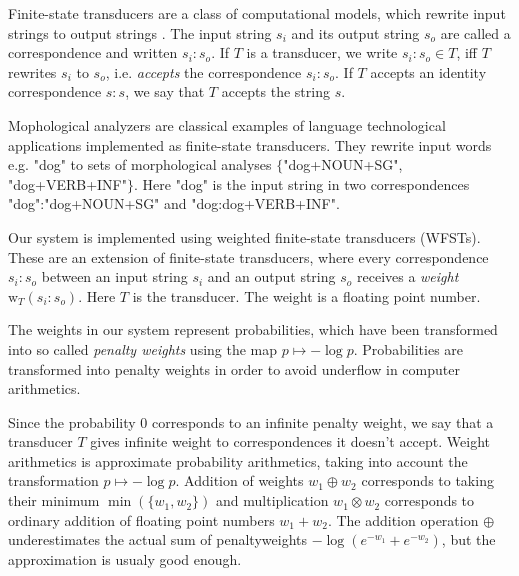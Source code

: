 \documentclass[a4paper,conference]{IEEEtran}
\begin{document}
Finite-state transducers are a class of computational models, which
rewrite input strings to output strings \cite{beesley/2003}. The input
string $s_i$ and its output string $s_o$ are called a correspondence
and written $s_i\mathrm{:}s_o$. If $T$ is a transducer, we write
$s_i\mathrm{:}s_o \in T$, iff $T$ rewrites $s_i$ to $s_o$, i.e. {\it
  accepts} the correspondence $s_i\mathrm{:}s_o$. If $T$ accepts an
identity correspondence $s\mathrm{:}s$, we say that $T$ accepts the
string $s$.

Mophological analyzers are classical examples of language
technological applications implemented as finite-state
transducers. They rewrite input words e.g. "dog" to sets of
morphological analyses $\{$"dog+NOUN+SG", "dog+VERB+INF"$\}$. Here
"dog" is the input string in two correspondences "dog":"dog+NOUN+SG"
and "dog:dog+VERB+INF".

Our system is implemented using weighted finite-state transducers
(WFSTs). These are an extension of finite-state transducers, where
every correspondence $s_i\mathrm{:}s_o$ between an input string $s_i$
and an output string $s_o$ receives a {\it weight} $\mathrm{w}_T(s_i\mathrm{:}s_o)$. Here $T$ is the transducer. The weight is a floating point number. 

The weights in our system represent probabilities, which have been
transformed into so called {\it penalty weights} using the map $p
\mapsto -\log p$. Probabilities are transformed into penalty weights
in order to avoid underflow in computer arithmetics. 

Since the probability $0$ corresponds to an infinite penalty weight,
we say that a transducer $T$ gives infinite weight to correspondences
it doesn't accept. Weight arithmetics is approximate probability
arithmetics, taking into account the transformation $p \mapsto -\log
p$. Addition of weights $w_1 \oplus w_2$ corresponds to taking
their minimum $\min(\{w_1,w_2\})$ and multiplication $w_1 \otimes w_2$
corresponds to ordinary addition of floating point numbers $w_1 +
w_2$. The addition operation $\oplus$ underestimates the actual sum of
penaltyweights $-\log (e^{-w_1} + e^{-w_2})$, but the approximation is usualy good enough.
\end{document}
